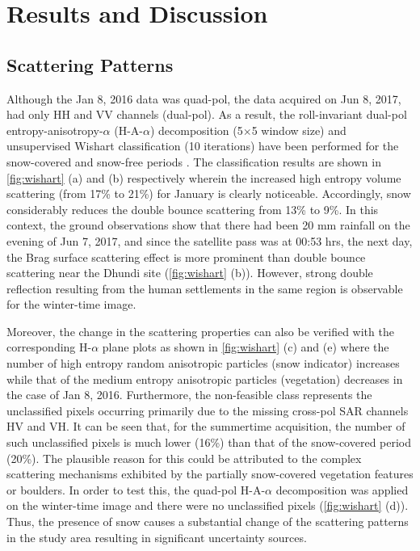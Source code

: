 \documentclass{article}
\begin{document}
\section{Results and Discussion}
\label{sec:results}
\subsection{Scattering Patterns}
\label{ssec:scat}
Although the Jan 8, 2016 data was quad-pol, the data acquired on Jun 8, 2017, had only HH and VV channels (dual-pol). As a result, the roll-invariant dual-pol entropy-anisotropy-$\alpha$ (H-A-$\alpha$) decomposition (5$\times$5 window size) and unsupervised Wishart classification (10 iterations) have been performed for the snow-covered and snow-free periods \cite{Singh2014}. The classification results are shown in \ref{fig:wishart} (a) and (b) respectively wherein the increased high entropy volume scattering (from 17\% to 21\%) for January is clearly noticeable. Accordingly, snow considerably reduces the double bounce scattering from 13\% to 9\%. In this context, the ground observations show that there had been 20 mm rainfall on the evening of Jun 7, 2017, and since the satellite pass was at 00:53 hrs, the next day, the Brag surface scattering effect is more prominent than double bounce scattering near the Dhundi site (\ref{fig:wishart} (b)). However, strong double reflection resulting from the human settlements in the same region is observable for the winter-time image.  

Moreover, the change in the scattering properties can also be verified with the corresponding H-$\alpha$ plane plots as shown in \ref{fig:wishart} (c) and (e) where the number of high entropy random anisotropic particles (snow indicator) increases while that of the medium entropy anisotropic particles (vegetation) decreases in the case of Jan 8, 2016. Furthermore, the non-feasible class represents the unclassified pixels occurring primarily due to the missing cross-pol SAR channels HV and VH. It can be seen that, for the summertime acquisition, the number of such unclassified pixels is much lower (16\%) than that of the snow-covered period (20\%). The plausible reason for this could be attributed to the complex scattering mechanisms exhibited by the partially snow-covered vegetation features or boulders. In order to test this, the quad-pol H-A-$\alpha$ decomposition was applied on the winter-time image and there were no unclassified pixels (\ref{fig:wishart} (d)). Thus, the presence of snow causes a substantial change of the scattering patterns in the study area resulting in significant uncertainty sources.
\vspace{-1ex}
\end{document}
